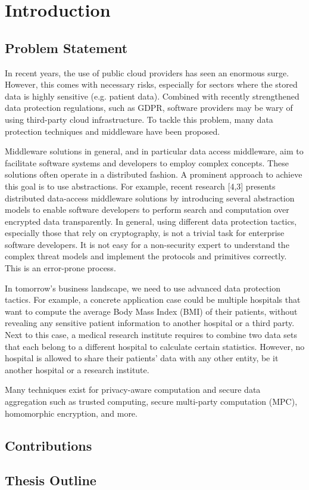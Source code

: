 \chapter{Introduction}
\label{cha:intro}

\section{Problem Statement}
In recent years, the use of public cloud providers has seen an enormous surge. However, this comes with necessary risks, especially for sectors where the stored data is highly sensitive (e.g. patient data). Combined with recently strengthened data protection regulations, such as GDPR, software providers may be wary of using third-party cloud infrastructure. To tackle this problem, many data protection techniques and middleware have been proposed. 

Middleware solutions in general, and in particular data access middleware, aim to facilitate software systems and developers to employ complex concepts. These solutions often operate in a distributed fashion. A prominent approach to achieve this goal is to use abstractions. For example, recent research [4,3] presents distributed data-access middleware solutions by introducing several abstraction models to enable software developers to perform search and computation over encrypted data transparently. In general, using different data protection tactics, especially those that rely on cryptography, is not a trivial task for enterprise software developers. It is not easy for a non-security expert to understand the complex threat models and implement the protocols and primitives correctly. This is an error-prone process.

In tomorrow's business landscape, we need to use advanced data protection tactics. For example, a concrete application case could be multiple hospitals that want to compute the average Body Mass Index (BMI) of their patients, without revealing any sensitive patient information to another hospital or a third party. Next to this case, a medical research institute requires to combine two data sets that each belong to a different hospital to calculate certain statistics. However, no hospital is allowed to share their patients' data with any other entity, be it another hospital or a research institute.

Many techniques exist for privacy-aware computation and secure data aggregation such as trusted computing, secure multi-party computation (MPC), homomorphic encryption, and more. 


\section{Contributions}
\lipsum[6-7]

\section{Thesis Outline}
\lipsum[2-3]